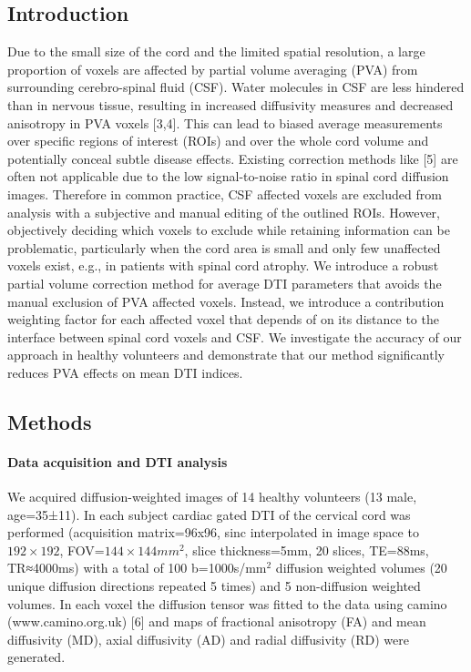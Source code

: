 \subsection*{Introduction}
Due to the small size of the cord and the limited spatial resolution, a large proportion of voxels are affected by partial volume averaging (PVA) from surrounding cerebro-spinal fluid (CSF). Water molecules in CSF are less hindered than in nervous tissue, resulting in increased diffusivity measures and decreased anisotropy in PVA voxels [3,4]. This can lead to biased average measurements over specific regions of interest (ROIs) and over the whole cord volume and potentially conceal subtle disease effects. Existing correction methods like [5] are often not applicable due to the low signal-to-noise ratio in spinal cord diffusion images. Therefore in common practice, CSF affected voxels are excluded from analysis with a subjective and manual editing of the outlined ROIs. However, objectively deciding which voxels to exclude while retaining information can be problematic, particularly when the cord area is small and only few unaffected voxels exist, e.g., in patients with spinal cord atrophy. We introduce a robust partial volume correction method for average DTI parameters that avoids the manual exclusion of PVA affected voxels. Instead, we introduce a contribution weighting factor for each affected voxel that depends of on its distance to the interface between spinal cord voxels and CSF. We investigate the accuracy of our approach in healthy volunteers and demonstrate that our method significantly reduces PVA effects on mean DTI indices.
\subsection*{Methods}
\paragraph{Data acquisition and DTI analysis}
We acquired diffusion-weighted images of 14 healthy volunteers (13 male, age=35±11). In each subject cardiac gated DTI of the cervical cord was performed (acquisition matrix=96x96, sinc interpolated in image space to $192\times 192$, FOV=$144\times 144mm^2$, slice thickness=5mm, 20 slices, TE=88ms, TR≈4000ms) with a total of 100 b=1000s/mm$^2$ diffusion weighted volumes (20 unique diffusion directions repeated 5 times) and 5 non-diffusion weighted volumes. In each voxel the diffusion tensor was fitted to the data using camino  (www.camino.org.uk) [6] and maps of fractional anisotropy (FA) and mean diffusivity (MD), axial diffusivity (AD) and radial diffusivity (RD) were generated. 

